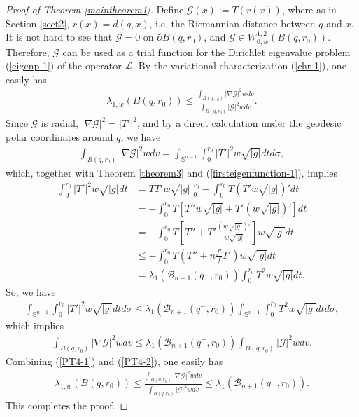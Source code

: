\documentclass[12pt]{article}
\begin{document}
\begin{proof} [Proof of Theorem \ref{maintheorem1}]
Define $\mathcal {G}(x):=T(r(x))$, where as in Section \ref{sect2},
$r(x)=d(q,x)$, i.e. the Riemannian distance between $q$ and $x$. It
is not hard to see that $\mathcal {G}= 0$ on $\partial B(q, r_0)$,
and $\mathcal {G}\in W^{1,2}_{0,w}(B(q,r_0))$. Therefore,
$\mathcal{G}$ can be used as a trial function for the Dirichlet
eigenvalue problem (\ref{eigenp-1}) of the operator $\mathcal{L}$.
By the variational characterization (\ref{chr-1}), one easily has
 \begin{eqnarray} \label{PT4-1}
\lambda_{1,w}(B(q, r_0))\leq \frac{\int_{B(q, r_0)}|\nabla
\mathcal{G}|^{2}wdv}{\int_{B(q, r_0)}|\mathcal{G}|^{2}wdv}.
 \end{eqnarray}
Since $\mathcal{G}$ is radial, $|\nabla\mathcal{G}|^2=|T'|^2$, and
by a direct calculation under the geodesic polar coordinates around
$q$, we have
 \begin{eqnarray*}
\int_{B(q, r_0)}|\nabla
\mathcal{G}|^{2}wdv=\int_{\mathbb{S}^{n-1}}\int^{r_0}_{0}|T'|^{2}w\sqrt{|g|}dtd\sigma,
 \end{eqnarray*}
which, together with Theorem \ref{theorem3} and
(\ref{firsteigenfunction-1}), implies
\begin{equation*}
\begin{aligned}
\int^{r_0}_{0}|T'|^{2}w\sqrt{|g|}dt
&=TT'w\sqrt{|g|}\Big|^{r_0}_{0}-\int^{r_0}_{0}T(T'w\sqrt{|g|})'dt  \\
&=-\int^{r_0}_{0}T\left[T''w\sqrt{|g|}+T'(w\sqrt{|g|})'\right]dt  \\
&=-\int^{r_0}_{0}T\left[T''+T'\frac{(w\sqrt{|g|})'}{w\sqrt{|g|}}\right]w\sqrt{|g|}dt  \\
&\leq -\int^{r_0}_{0}T\left(T''+n\frac{f'}{f}T'\right)w\sqrt{|g|}dt  \\
&=\lambda_{1}\left(\mathscr{B}_{n+1}(q^{-},r_0)\right)\int^{r_0}_{0}T^{2}w\sqrt{|g|}dt.
\end{aligned}
\end{equation*}
So, we have
\begin{eqnarray*}
\int_{\mathbb{S}^{n-1}}\int^{r_0}_{0}|T'|^{2}w\sqrt{|g|}dtd\sigma\leq\lambda_{1}\left(\mathscr{B}_{n+1}(q^{-},r_0)\right)\int_{\mathbb{S}^{n-1}}\int^{r_0}_{0}T^{2}w\sqrt{|g|}dtd\sigma,
\end{eqnarray*}
which implies
\begin{eqnarray} \label{PT4-2}
\int_{B(q, r_0)}|\nabla
\mathcal{G}|^{2}wdv\leq\lambda_{1}\left(\mathscr{B}_{n+1}(q^{-},r_0)\right)\int_{B(q,
r_0)}|\mathcal{G}|^{2}wdv.
\end{eqnarray}
Combining (\ref{PT4-1}) and  (\ref{PT4-2}), one easily has
\begin{eqnarray*}
\lambda_{1,w}(B(q, r_0))\leq \frac{\int_{B(q, r_0)}|\nabla
\mathcal{G}|^{2}wdv}{\int_{B(q,
r_0)}|\mathcal{G}|^{2}wdv}\leq\lambda_{1}\left(\mathscr{B}_{n+1}(q^{-},r_0)\right).
\end{eqnarray*}
This completes the proof.
\end{proof}
\end{document}
